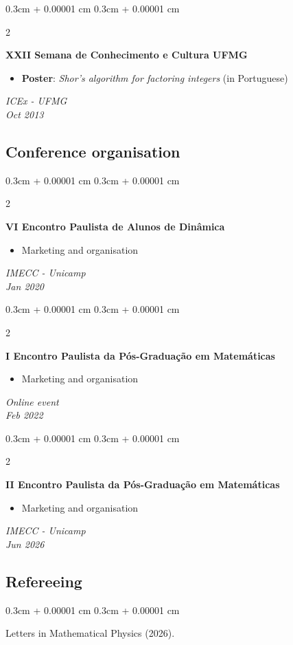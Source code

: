 \documentclass[10pt, letterpaper]{article}
\newenvironment{highlights}{
    \begin{itemize}[
        topsep=0.10 cm,
        parsep=0.10 cm,
        partopsep=0pt,
        itemsep=0pt,
        leftmargin=0.4 cm + 10pt
    ]
}{
    \end{itemize}
} %
\newenvironment{onecolentry}{
    \begin{adjustwidth}{
        0.3cm + 0.00001 cm
    }{
        0.3cm + 0.00001 cm
    }
}{
    \end{adjustwidth}
} %
\newenvironment{twocolentry}[2][]{
    \onecolentry
    \def\secondColumn{#2}
    \setcolumnwidth{\fill, 5 cm}
    \begin{paracol}{2}
    \small 
}{
    \switchcolumn \raggedleft \secondColumn
    \end{paracol}
    \endonecolentry
} %
\begin{document}
    \begin{twocolentry}{\textit{ICEx - UFMG \\ Oct 2013}}
        \textbf{XXII Semana de Conhecimento e Cultura UFMG}
        \begin{highlights}
            \item \textbf{Poster}: \textit{Shor's algorithm for factoring integers} (in Portuguese)
        \end{highlights}
    \end{twocolentry} \vspace{0.1cm}
    
    \subsection{Conference organisation}
    \begin{twocolentry}{\textit{IMECC - Unicamp \\ Jan 2020}}
        \textbf{VI Encontro Paulista de Alunos de Dinâmica}
        \begin{highlights}
            \item Marketing and organisation
        \end{highlights}
    \end{twocolentry} \vspace{0.1cm}
    
    \begin{twocolentry}{\textit{Online event \\ Feb 2022}}
        \textbf{I Encontro Paulista da Pós-Graduação em Matemáticas}
        \begin{highlights}
            \item Marketing and organisation
        \end{highlights}
    \end{twocolentry} \vspace{0.1cm}

    \begin{twocolentry}{\textit{IMECC - Unicamp \\ Jun 2026}}
        \textbf{II Encontro Paulista da Pós-Graduação em Matemáticas}
        \begin{highlights}
            \item Marketing and organisation
        \end{highlights}
    \end{twocolentry} \vspace{0.1cm}

    \subsection{Refereeing}
    \begin{onecolentry}
        Letters in Mathematical Physics (2026).
    \end{onecolentry} \vspace{0.1cm}
\end{document}
